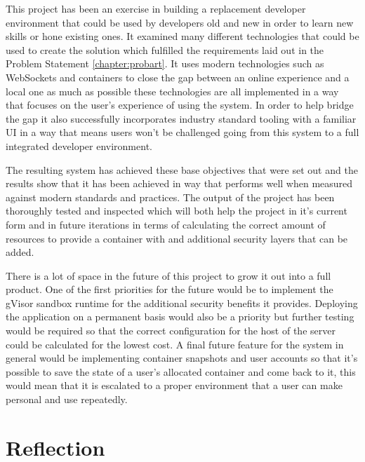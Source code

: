 \documentclass[12pt, a4paper]{extreport}
\begin{document}

This project has been an exercise in building a replacement developer environment that could be used by developers old and new in order to learn new skills or hone existing ones. It examined many different technologies that could be used to create the solution which fulfilled the requirements laid out in the Problem Statement \ref{chapter:probart}. It uses modern technologies such as WebSockets and containers to close the gap between an online experience and a local one as much as possible these technologies are all implemented in a way that focuses on the user's experience of using the system. In order to help bridge the gap it also successfully incorporates industry standard tooling with a familiar UI in a way that means users won't be challenged going from this system to a full integrated developer environment.

The resulting system has achieved these base objectives that were set out and the results show that it has been achieved in way that performs well when measured against modern standards and practices. The output of the project has been thoroughly tested and inspected which will both help the project in it's current form and in future iterations in terms of calculating the correct amount of resources to provide a container with and additional security layers that can be added.

There is a lot of space in the future of this project to grow it out into a full product. One of the first priorities for the future would be to implement the gVisor sandbox runtime for the additional security benefits it provides. Deploying the application on a permanent basis would also be a priority but further testing would be required so that the correct configuration for the host of the server could be calculated for the lowest cost. A final future feature for the system in general would be implementing container snapshots and user accounts so that it's possible to save the state of a user's allocated container and come back to it, this would mean that it is escalated to a proper environment that a user can make personal and use repeatedly. 

\pagebreak

\chapter{Reflection}
\end{document}
